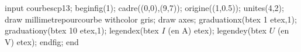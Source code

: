 \documentclass[a4paper,12pt,oneside]{article}
\begin{document}
input courbescp13;
beginfig(1);
  cadre((0,0),(9,7));
  origine((1,0.5));
  unites(4,2);
  draw millimetrepourcourbe withcolor gris;
  draw axes;
  graduationx(btex 1 etex,1);
  graduationy(btex 10 etex,1);
  legendex(btex $I$ (en A) etex);
  legendey(btex $U$ (en V) etex);
endfig;
end
\end{document}

